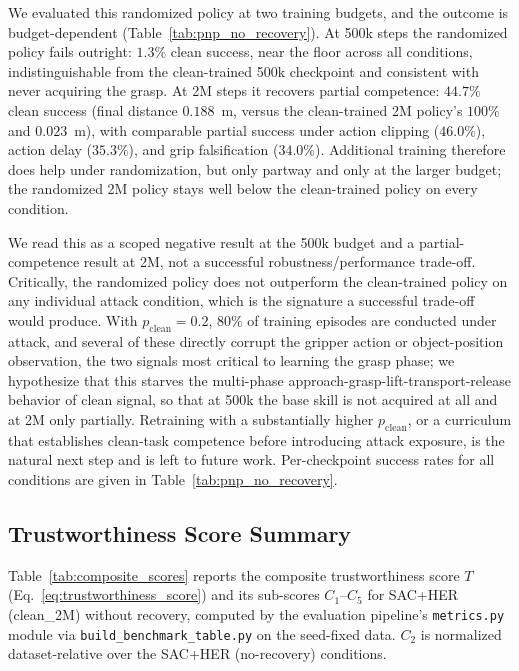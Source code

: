 \documentclass[conference]{IEEEtran}
\begin{document}
We evaluated this randomized policy at two training budgets, and the outcome is
budget-dependent (Table~\ref{tab:pnp_no_recovery}). At 500k steps the randomized policy
fails outright: $1.3\%$ clean success, near the floor across all conditions,
indistinguishable from the clean-trained 500k checkpoint and consistent with never
acquiring the grasp. At 2M steps it recovers partial competence: $44.7\%$ clean success
(final distance $0.188$~m, versus the clean-trained 2M policy's $100\%$ and $0.023$~m),
with comparable partial success under action clipping ($46.0\%$), action delay
($35.3\%$), and grip falsification ($34.0\%$). Additional training therefore does help
under randomization, but only partway and only at the larger budget; the randomized 2M
policy stays well below the clean-trained policy on every condition.

We read this as a scoped negative result at the 500k budget and a partial-competence
result at 2M, not a successful robustness/performance trade-off. Critically, the
randomized policy does not outperform the clean-trained policy on any individual attack
condition, which is the signature a successful trade-off would produce. With
$p_{\mathrm{clean}}=0.2$, $80\%$ of training episodes are conducted under attack, and
several of these directly corrupt the gripper action or object-position observation, the
two signals most critical to learning the grasp phase; we hypothesize that this starves
the multi-phase approach-grasp-lift-transport-release behavior of clean signal, so that
at 500k the base skill is not acquired at all and at 2M only partially. Retraining with
a substantially higher $p_{\mathrm{clean}}$, or a curriculum that establishes clean-task
competence before introducing attack exposure, is the natural next step and is left to
future work. Per-checkpoint success rates for all conditions are given in
Table~\ref{tab:pnp_no_recovery}.

\subsection{Trustworthiness Score Summary}

Table~\ref{tab:composite_scores} reports the composite trustworthiness score $T$
(Eq.~\ref{eq:trustworthiness_score}) and its sub-scores $C_1$--$C_5$ for SAC+HER
(clean\_2M) without recovery, computed by the evaluation pipeline's \texttt{metrics.py}
module via \texttt{build\_benchmark\_table.py} on the seed-fixed data. $C_2$ is
normalized dataset-relative over the SAC+HER (no-recovery) conditions.
\end{document}
